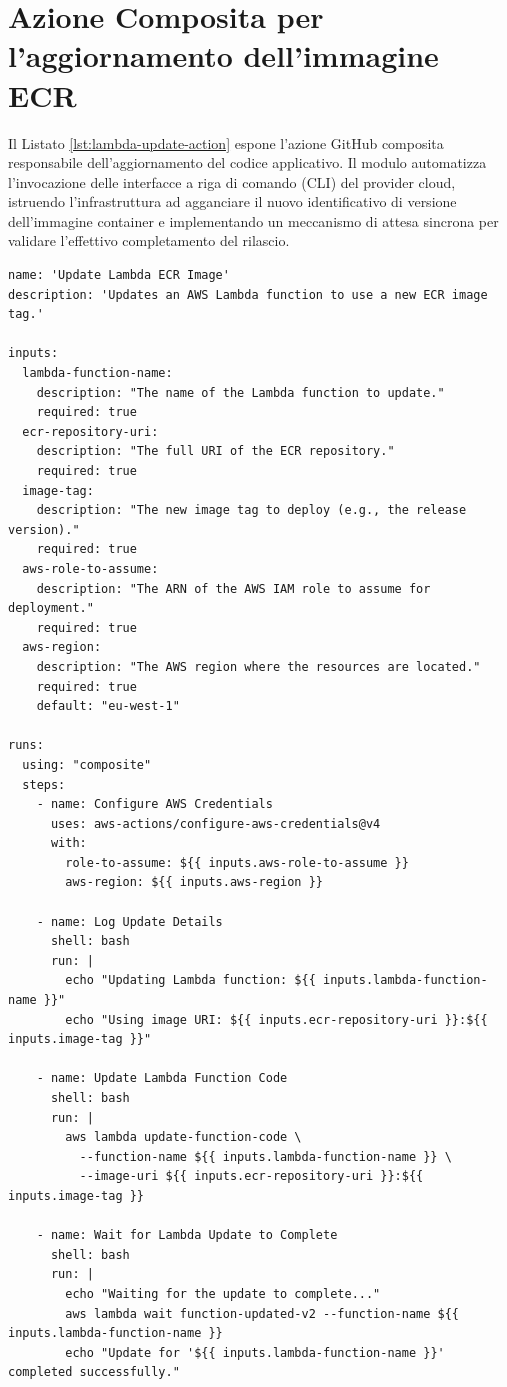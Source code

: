 \section{Azione Composita per l'aggiornamento dell'immagine ECR}
Il Listato \ref{lst:lambda-update-action} espone l'azione GitHub composita responsabile dell'aggiornamento del codice applicativo. Il modulo automatizza l'invocazione delle interfacce a riga di comando (CLI) del provider cloud, istruendo l'infrastruttura ad agganciare il nuovo identificativo di versione dell'immagine container e implementando un meccanismo di attesa sincrona per validare l'effettivo completamento del rilascio.

\begin{lstlisting}[label={lst:lambda-update-action}]
name: 'Update Lambda ECR Image'
description: 'Updates an AWS Lambda function to use a new ECR image tag.'

inputs:
  lambda-function-name:
    description: "The name of the Lambda function to update."
    required: true
  ecr-repository-uri:
    description: "The full URI of the ECR repository."
    required: true
  image-tag:
    description: "The new image tag to deploy (e.g., the release version)."
    required: true
  aws-role-to-assume:
    description: "The ARN of the AWS IAM role to assume for deployment."
    required: true
  aws-region:
    description: "The AWS region where the resources are located."
    required: true
    default: "eu-west-1"

runs:
  using: "composite"
  steps:
    - name: Configure AWS Credentials
      uses: aws-actions/configure-aws-credentials@v4
      with:
        role-to-assume: ${{ inputs.aws-role-to-assume }}
        aws-region: ${{ inputs.aws-region }}

    - name: Log Update Details
      shell: bash
      run: |
        echo "Updating Lambda function: ${{ inputs.lambda-function-name }}"
        echo "Using image URI: ${{ inputs.ecr-repository-uri }}:${{ inputs.image-tag }}"

    - name: Update Lambda Function Code
      shell: bash
      run: |
        aws lambda update-function-code \
          --function-name ${{ inputs.lambda-function-name }} \
          --image-uri ${{ inputs.ecr-repository-uri }}:${{ inputs.image-tag }}

    - name: Wait for Lambda Update to Complete
      shell: bash
      run: |
        echo "Waiting for the update to complete..."
        aws lambda wait function-updated-v2 --function-name ${{ inputs.lambda-function-name }}
        echo "Update for '${{ inputs.lambda-function-name }}' completed successfully."
\end{lstlisting}